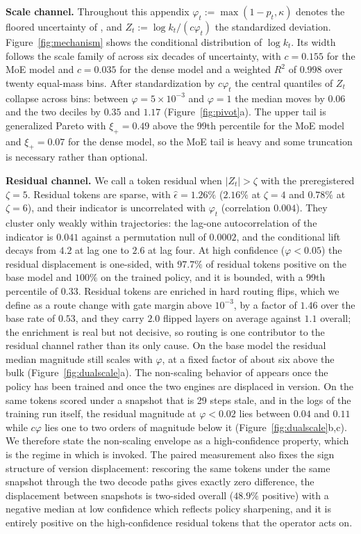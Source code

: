 \noindent\textbf{Scale channel.}
Throughout this appendix $\varphi_t:=\max(1-p_t,\kappa)$ denotes the floored uncertainty of , and $Z_t:=\log k_t/(c\varphi_t)$ the standardized deviation. Figure~\ref{fig:mechanism} shows the conditional distribution of $\log k_t$. Its width follows the scale family of  across six decades of uncertainty, with $c=0.155$ for the MoE model and $c=0.035$ for the dense model and a weighted $R^2$ of $0.998$ over twenty equal-mass bins. After standardization by $c\varphi_t$ the central quantiles of $Z_t$ collapse across bins: between $\varphi=5\times10^{-3}$ and $\varphi=1$ the median moves by $0.06$ and the two deciles by $0.35$ and $1.17$ (Figure~\ref{fig:pivot}a). The upper tail is generalized Pareto with $\xi_+=0.49$ above the 99th percentile for the MoE model and $\xi_+=0.07$ for the dense model, so the MoE tail is heavy and some truncation is necessary rather than optional.

\noindent\textbf{Residual channel.}
We call a token residual when $|Z_t|>\zeta$ with the preregistered $\zeta=5$. Residual tokens are sparse, with $\hat\epsilon=1.26\%$ ($2.16\%$ at $\zeta=4$ and $0.78\%$ at $\zeta=6$), and their indicator is uncorrelated with $\varphi_t$ (correlation $0.004$). They cluster only weakly within trajectories: the lag-one autocorrelation of the indicator is $0.041$ against a permutation null of $0.0002$, and the conditional lift decays from $4.2$ at lag one to $2.6$ at lag four. At high confidence ($\varphi<0.05$) the residual displacement is one-sided, with $97.7\%$ of residual tokens positive on the base model and $100\%$ on the trained policy, and it is bounded, with a 99th percentile of $0.33$. Residual tokens are enriched in hard routing flips, which we define as a route change with gate margin above $10^{-3}$, by a factor of $1.46$ over the base rate of $0.53$, and they carry $2.0$ flipped layers on average against $1.1$ overall; the enrichment is real but not decisive, so routing is one contributor to the residual channel rather than its only cause. On the base model the residual median magnitude still scales with $\varphi$, at a fixed factor of about six above the bulk (Figure~\ref{fig:dualscale}a). The non-scaling behavior of  appears once the policy has been trained and once the two engines are displaced in version. On the same tokens scored under a snapshot that is 29 steps stale, and in the logs of the training run itself, the residual magnitude at $\varphi<0.02$ lies between $0.04$ and $0.11$ while $c\varphi$ lies one to two orders of magnitude below it (Figure~\ref{fig:dualscale}b,c). We therefore state the non-scaling envelope as a high-confidence property, which is the regime in which  is invoked. The paired measurement also fixes the sign structure of version displacement: rescoring the same tokens under the same snapshot through the two decode paths gives exactly zero difference, the displacement between snapshots is two-sided overall ($48.9\%$ positive) with a negative median at low confidence which reflects policy sharpening, and it is entirely positive on the high-confidence residual tokens that the operator acts on.

